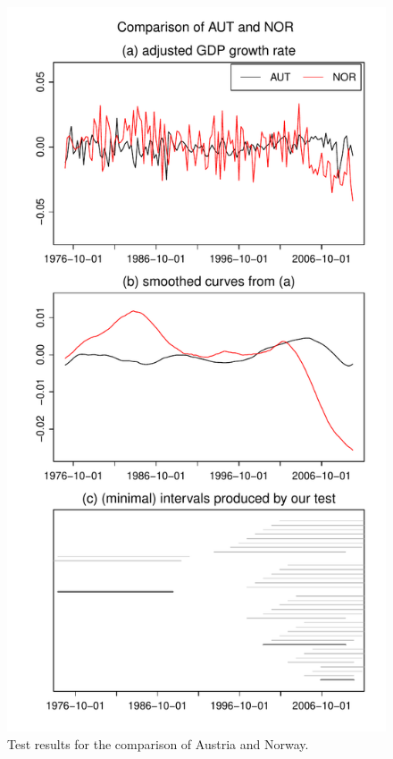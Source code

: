 \documentclass[12pt]{article}
\begin{document}
\begin{figure}
\hspace{0.1cm}
\begin{minipage}[t]{0.24\textwidth}
\includegraphics[width=\textwidth]{../output/plots/gdp/AUT_vs_NOR}
\caption{Test results for the comparison of Austria and Norway.}\label{fig:Austria:Norway}
\end{minipage}
\hspace{0.1cm}

\end{figure}
\end{document}
